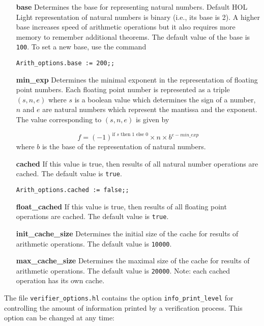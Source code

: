 \documentclass[a4paper]{article}
\begin{document}
\begin{enumerate}
\item[\bf base] Determines the base for representing natural numbers. Default HOL Light 
representation of natural numbers is binary (i.e., its base is 2). A higher base increases speed of arithmetic operations but it also requires more memory to remember additional theorems. The default value of the base is \verb|100|. To set a new base, use the command

\verb|Arith_options.base := 200;;|

\item[\bf min\_exp] Determines the minimal exponent in the representation of floating point numbers. Each floating point number is represented as a triple $(s, n, e)$ where $s$ is a boolean value which determines the sign of a number, $n$ and $e$ are natural numbers which represent the mantissa and the exponent. The value corresponding to $(s, n, e)$ is given by

\[f = (-1)^{\text{if $s$ then $1$ else $0$}} \times n \times b^{e - min\_exp}\]
where $b$ is the base of the representation of natural numbers.

\item[\bf cached] If this value is true, then results of all natural number operations are cached. The default value is \verb|true|.

\verb|Arith_options.cached := false;;|

\item[\bf float\_cached] If this value is true, then results of all floating point operations are cached. The default value is \verb|true|.

\item[\bf init\_cache\_size] Determines the initial size of the cache for results of arithmetic operations. The default value is \verb|10000|.

\item[\bf max\_cache\_size] Determines the maximal size of the cache for results of arithmetic operations. The default value is \verb|20000|. Note: each cached operation has its own cache.

\end{enumerate}

The file \verb|verifier_options.hl| contains the option \verb|info_print_level| for controlling the amount of information printed by a verification process. This option can be changed at any time:
\end{document}
